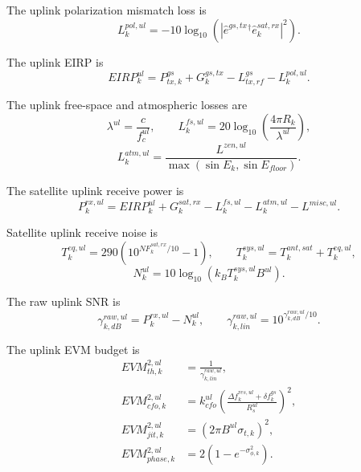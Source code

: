 \documentclass[11pt]{article}
\begin{document}
The uplink polarization mismatch loss is
\begin{equation}
  L^{pol,ul}_k
  =
  -10 \log_{10}\left(
    \left| \hat{e}^{gs,tx}{}^\dagger \hat{e}^{sat,rx}_k \right|^2
  \right).
\end{equation}

The uplink EIRP is
\begin{equation}
  EIRP^{ul}_k
  =
  P^{gs}_{tx,k}
  + G^{gs,tx}_k
  - L^{gs}_{tx,rf}
  - L^{pol,ul}_k.
\end{equation}

The uplink free-space and atmospheric losses are
\begin{equation}
  \lambda^{ul} = \frac{c}{f_c^{ul}},
  \qquad
  L^{fs,ul}_k = 20 \log_{10}\left( \frac{4\pi R_k}{\lambda^{ul}} \right),
\end{equation}
\begin{equation}
  L^{atm,ul}_k
  =
  \frac{L^{zen,ul}}{\max(\sin E_k, \sin E_{floor})}.
\end{equation}

The satellite uplink receive power is
\begin{equation}
  P^{rx,ul}_k
  =
  EIRP^{ul}_k
  + G^{sat,rx}_k
  - L^{fs,ul}_k
  - L^{atm,ul}_k
  - L^{misc,ul}.
\end{equation}

Satellite uplink receive noise is
\begin{equation}
  T^{eq,ul}_k = 290\left(10^{NF^{sat,rx}_k/10} - 1\right),
  \qquad
  T^{sys,ul}_k = T^{ant,sat}_k + T^{eq,ul}_k,
\end{equation}
\begin{equation}
  N^{ul}_k = 10 \log_{10}\left(k_B T^{sys,ul}_k B^{ul}\right).
\end{equation}

The raw uplink SNR is
\begin{equation}
  \gamma^{raw,ul}_{k,dB} = P^{rx,ul}_k - N^{ul}_k,
  \qquad
  \gamma^{raw,ul}_{k,lin} = 10^{\gamma^{raw,ul}_{k,dB}/10}.
\end{equation}

The uplink EVM budget is
\begin{align}
  EVM^{2,ul}_{th,k}
  &= \frac{1}{\gamma^{raw,ul}_{k,lin}}, \\
  EVM^{2,ul}_{cfo,k}
  &= k^{ul}_{cfo}\left(\frac{\Delta f^{res,ul}_k + \delta f^{gs}_k}{R^{ul}_s}\right)^2, \\
  EVM^{2,ul}_{jit,k}
  &= \left(2\pi B^{ul}\sigma_{t,k}\right)^2, \\
  EVM^{2,ul}_{phase,k}
  &= 2\left(1 - e^{-\sigma_{\phi,k}^2}\right).
\end{align}
\end{document}
